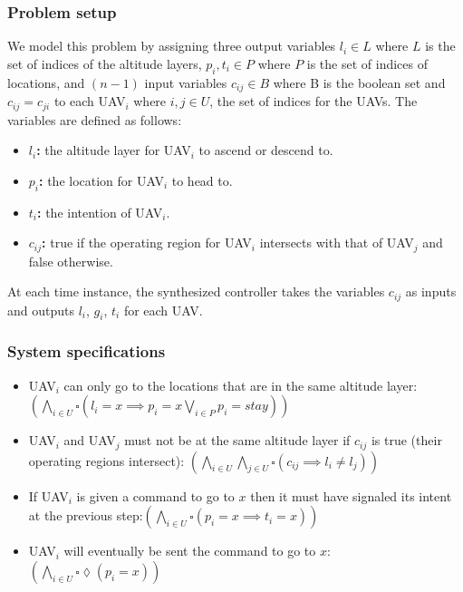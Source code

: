 \documentclass[]{article}
\begin{document}
\subsubsection{Problem setup}\label{problem-setup}

We model this problem by assigning three output variables $l_{i} \in L$ where $L$ is the set of indices of the altitude layers, $p_{i},t_{i} \in P$ where $P$ is the set of indices of locations, and $(n-1)$ input variables $c_{ij}  \in B$ where B is the boolean set and $c_{ij} = c_{ji}$ to each UAV$_{i}$ where $i,j \in U$, the set of indices for the UAVs. The variables are defined as follows: 

\begin{itemize}
\item
  \textbf{$l_{i}$:} the altitude layer for UAV$_{i}$ to ascend or descend to.
\item
  \textbf{$p_{i}$:} the location for UAV$_{i}$ to head to.
\item
  \textbf{$t_{i}$:} the intention of  UAV$_{i}$.
\item
  \textbf{$c_{ij}$:} true if the operating region for
  UAV$_{i}$ intersects with that of UAV$_{j}$ and false otherwise.
\end{itemize}

At each time instance, the synthesized controller takes the variables $c_{ij}$ as inputs and outputs $l_{i}$, $g_{i}$, $t_{i}$ for each UAV\@.

\subsubsection{System specifications}\label{system-specifications}

\begin{itemize}
\itemsep1pt\parskip0pt
\item
  UAV$_{i}$ can only go to the locations that are in the same altitude
  layer: $(\bigwedge\limits_{i \in U} \square (l_{i} = x \implies p_{i} = x \bigvee\limits_{i \in P} p_{i} = stay))$
\item
  UAV$_{i}$ and UAV$_{j}$ must not be at the same altitude layer if
  $c_{ij}$ is true (their operating regions intersect): $(\bigwedge\limits_{i\in U} \bigwedge\limits_{j\in U} \square (c_{ij} \implies l_{i} \neq l_{j}))$
\item
  If UAV$_{i}$ is given a command to go to $x$ then it must have
  signaled its intent at the previous step:$(\bigwedge\limits_{i \in U} \square (p_{i} = x \implies t_{i} = x))$
\item
  UAV$_{i}$ will eventually be sent the command to go to $x$: $(\bigwedge\limits_{i \in U} \square \lozenge (p_{i} = x))$
\end{itemize}
\end{document}
